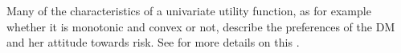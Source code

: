 Many of the characteristics of a univariate utility function, as for example whether it is monotonic and convex or not, describe the preferences of the \gls{DM} and her attitude towards risk. See for more details on this \citet{Keeney1993a}.
\begin{comment}  
Utility functions are often in practice \textit{monotonic}. 
\begin{definition}
If $r_i>r_i^{'} \Longleftrightarrow u_i(r_i)>u_i(r_i^{'})$, then the utility function is monotonically increasing. If $r_i>r_i^{'} \Longleftrightarrow u_i(r_i)<u_i(r_i^{'})$, then the utility function is monotonically decreasing. Otherwise, it is non-monotonic.
\end{definition}

\begin{example}
The linear utility function in equation (\ref{eq:linearut}) is monotonically increasing, whilst the exponential in equation (\ref{eq:exput}) is monotonically decreasing. The quadratic utility function in equation (\ref{eq:quadraticut}) is nonmonotonic, but restricting its domain to the negative real line, then we can note that this utility is monotonically increasing.
\end{example}

As already mentioned, utility functions are further able to represent attitude towards risk. Consider for example two values $r_i$ and $r_i'$ of $R_i$ and a gamble yielding either of the two with equal probability. The expected utility of this gamble is $\bar{r}_i=(r_i+r_i')/2$. Suppose the \gls{DM} has the possibility to choose either to participate in the gamble or to receive $\bar{r}_i$ for sure. If she chooses the latter option, then she is actually stating that she prefers to avoid the risks associated to the gamble. In this case the \gls{DM} is said to be \textit{risk averse}. On the other end if she prefers participating in the gamble then she is said to be \textit{risk prone}. Lastly if she is indifferent between the two options then she is \textit{risk neutral}. The shape of the utility function is able to represent the \gls{DM}'s attitude towards risk.

\begin{proposition}
Let $u_i(r_i)$ be a monotonic utility function. The \gls{DM} is risk averse iff $u_i$ is concave, she is risk prone iff $u_i$ is convex and she is risk neutral iff $u$ is linear.
\end{proposition}

\begin{example}
Equation (\ref{eq:exput}) is the utility function of a risk prone \gls{DM}, whilst a \gls{DM} is risk averse if her utility is described by equation (\ref{eq:quadraticut}). A risk neutral \gls{DM} has the utility function in equation (\ref{eq:linearut}).
\end{example}


\end{comment}
